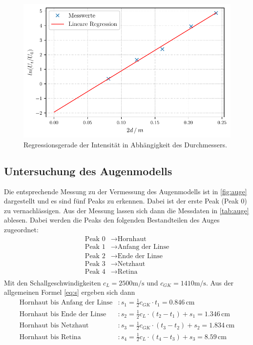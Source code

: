 \begin{figure}
  \centering
  \includegraphics[width = 0.7\linewidth]{build/plot3.pdf}
  \caption{Regressionsgerade der Intensität in Abhängigkeit des Durchmessers.}
  \label{fig:plot3}
\end{figure}

\subsection{Untersuchung des Augenmodells}

Die entsprechende Messung zu der Vermessung des Augenmodells ist in \autoref{fig:auge} dargestellt
und es sind fünf Peaks zu erkennen. Dabei ist der erste Peak (Peak 0) zu vernachlässigen.
Aus der Messung lassen sich dann die Messdaten in \autoref{tab:auge} ablesen.
Dabei werden die Peaks den folgenden Bestandteilen des Auges zugeordnet:
\begin{align*}
  \text{Peak 0} &\to \text{Hornhaut} \\
  \text{Peak 1} &\to \text{Anfang der Linse} \\
  \text{Peak 2} &\to \text{Ende der Linse} \\
  \text{Peak 3} &\to \text{Netzhaut} \\
  \text{Peak 4} &\to \text{Retina} \\  
\end{align*}
Mit den Schallgeschwindigkeiten $c_L = 2500 \unit{\meter / \second}$ und $c_{GK} = 1410 \unit{\meter / \second}$.
Aus der allgemeinen Formel \ref{eq:s} ergeben sich dann
\begin{align*}
  \text{Hornhaut bis Anfang der Linse}&: s_1 = \frac{1}{2} c_{GK} \cdot t_1 = 0.846 \, \unit{\centi\meter} \\
  \text{Hornhaut bis Ende der Linse}&: s_2 = \frac{1}{2} c_L \cdot (t_2 - t_1) + s_1 = 1.346 \, \unit{\centi\meter} \\
  \text{Hornhaut bis Netzhaut}&: s_3 = \frac{1}{2} c_{GK} \cdot (t_3 - t_2) + s_2 = 1.834 \, \unit{\centi\meter} \\
  \text{Hornhaut bis Retina}&: s_4 = \frac{1}{2} c_{L} \cdot (t_4 - t_3) + s_3 = 8.59 \, \unit{\centi\meter} 
\end{align*}


